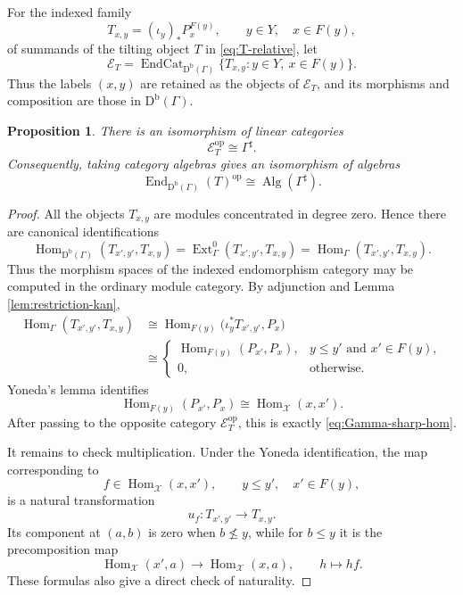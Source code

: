 \documentclass[12pt,a4paper,english,reqno]{amsart}
\theoremstyle{plain}
\newtheorem{proposition}[theorem]{Proposition}
\theoremstyle{definition}
\newcommand{\Db}{\mathrm D^{\mathrm b}}
\newcommand{\Hom}{\operatorname{Hom}}
\newcommand{\End}{\operatorname{End}}
\newcommand{\op}{\mathrm{op}}
\newcommand{\X}{\mathcal X}
\newcommand{\G}{\Gamma}
\newcommand{\Gs}{\Gamma^{\sharp}}
\newcommand{\Ext}{\operatorname{Ext}}
\begin{document}
For the indexed family
\[
 T_{x,y}=(\iota_y)_*P_x^{F(y)},
 \qquad y\in Y,\quad x\in F(y),
\]
of summands of the tilting object $T$ in \eqref{eq:T-relative}, let
\[
 \mathcal E_T
 =
 \operatorname{EndCat}_{\Db(\G)}
 \{T_{x,y}:y\in Y,\ x\in F(y)\}.
\]
Thus the labels $(x,y)$ are retained as the objects of $\mathcal E_T$, and
its morphisms and composition are those in $\Db(\G)$.

\begin{proposition}
\label{prop:end-relative}
There is an isomorphism of linear categories
\[
 \mathcal E_T^{\op}\cong\Gs.
\]
Consequently, taking category algebras gives an isomorphism of algebras
\[
 \End_{\Db(\G)}(T)^{\op}
 \cong\operatorname{Alg}(\Gs).
\]
\end{proposition}

\begin{proof}
All the objects $T_{x,y}$ are modules concentrated in degree zero.  Hence
there are canonical identifications
\[
 \Hom_{\Db(\G)}(T_{x',y'},T_{x,y})
 =\Ext^0_{\G}(T_{x',y'},T_{x,y})
 =\Hom_{\G}(T_{x',y'},T_{x,y}).
\]
Thus the morphism spaces of the indexed endomorphism category may be
computed in the ordinary module category.  By adjunction and Lemma
\ref{lem:restriction-kan},
\begin{align*}
 \Hom_{\G}(T_{x',y'},T_{x,y})
 &\cong
 \Hom_{F(y)}
 \bigl(\iota_y^*T_{x',y'},P_x\bigr)\\
 &\cong
 \begin{cases}
 \Hom_{F(y)}(P_{x'},P_x),
     &y\leq y'\text{ and }x'\in F(y),\\
 0,&\text{otherwise}.
 \end{cases}
\end{align*}
Yoneda's lemma identifies
\[
 \Hom_{F(y)}(P_{x'},P_x)\cong\Hom_{\X}(x,x').
\]
After passing to the opposite category $\mathcal E_T^{\op}$, this is exactly
\eqref{eq:Gamma-sharp-hom}.

It remains to check multiplication.  Under the Yoneda identification, the
map corresponding to
\[
 f\in\Hom_{\X}(x,x'),\qquad
 y\leq y',\quad x'\in F(y),
\]
is a natural transformation
\begin{equation}
 u_f:T_{x',y'}\longrightarrow T_{x,y}.
\label{eq:uf}
\end{equation}
Its component at $(a,b)$ is zero when $b\nleq y$, while for $b\leq y$
it is the precomposition map
\begin{equation}
 \Hom_{\X}(x',a)\longrightarrow\Hom_{\X}(x,a),
 \qquad h\longmapsto hf.
\label{eq:uf-component}
\end{equation}
These formulas also give a direct check of naturality.


\end{proof}
\end{document}
